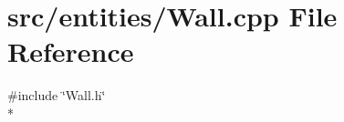 \section{src/entities/\-Wall.cpp File Reference}
\label{_wall_8cpp}
{\ttfamily \#include \char`\"{}Wall.\-h\char`\"{}}\\*
